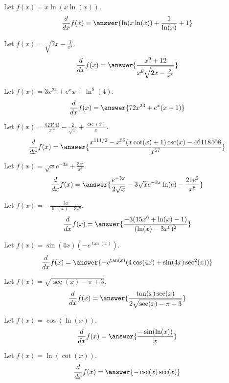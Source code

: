 \documentclass{ximera}
\begin{document}
\begin{shuffle}
\begin{exercise}
Let $f(x)=x \ln (x \ln (x))$.
\[
\ddx f(x) = \answer{\ln (x \ln (x))+\frac{1}{\ln (x)}+1}
\]
\end{exercise}

\begin{exercise}
Let $f(x)=\sqrt{2 x-\frac{3}{x^8}}$.
\[
\ddx f(x) = \answer{\frac{x^9+12}{x^9 \sqrt{2 x-\frac{3}{x^8}}}}
\]
\end{exercise}

\begin{exercise}
Let $f(x)=3 x^{24}+e^x x+\ln ^8(4)$.
\[
\ddx f(x) = \answer{72 x^{23}+e^x (x+1)}
\]
\end{exercise}

\begin{exercise}
Let $f(x)=\frac{823543}{x^{56}}-\frac{2}{\sqrt{x}}+\frac{\csc (x)}{x}$.
\[
\ddx f(x) = \answer{\frac{x^{111/2}-x^{55} (x \cot (x)+1) \csc (x)-46118408}{x^{57}}}
\]
\end{exercise}

\begin{exercise}
Let $f(x)=\sqrt{x} e^{-3 x}+\frac{3 e^2}{x^7}$.
\[
\ddx f(x) = \answer{\frac{e^{-3 x}}{2 \sqrt{x}}-3 \sqrt{x} e^{-3 x} \ln (e)-\frac{21 e^2}{x^8}}
\]
\end{exercise}

\begin{exercise}
Let $f(x)=-\frac{3 x}{\ln (x)-3 x^6}$.
\[
\ddx f(x) = \answer{\frac{-3 (15 x^6+\ln (x)-1)}{(\ln (x)-3 x^6)^2}}
\]
\end{exercise}

\begin{exercise}
Let $f(x)=\sin (4 x) (-e^{\tan (x)})$.
\[
\ddx f(x) = \answer{-e^{\tan (x)} (4 \cos (4 x)+\sin (4 x) \sec ^2(x))}
\]
\end{exercise}

\begin{exercise}
Let $f(x)=\sqrt{\sec (x)-\pi +3}$.
\[
\ddx f(x) = \answer{\frac{\tan (x) \sec (x)}{2 \sqrt{\sec (x)-\pi +3}}}
\]
\end{exercise}

\begin{exercise}
Let $f(x)=\cos (\ln (x))$.
\[
\ddx f(x) = \answer{\frac{-\sin (\ln (x))}{x}}
\]
\end{exercise}

\begin{exercise}
Let $f(x)=\ln (\cot (x))$.
\[
\ddx f(x) = \answer{-\csc (x) \sec (x)}
\]
\end{exercise}


\end{shuffle}
\end{document}
